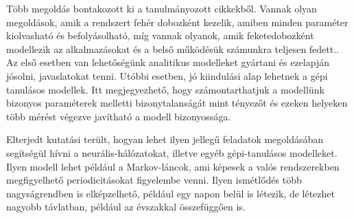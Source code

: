 Több megoldás bontakozott ki a tanulmányozott cikkekből. Vannak olyan megoldások, amik a rendszert fehér dobozként kezelik, amiben minden paraméter kiolvasható és befolyásolható, míg vannak olyanok, amik feketedobozként modellezik az alkalmazásokat és a belső működésük számunkra teljesen fedett.\citep{TowardsAnAdaptive}. Az első esetben van lehetőségünk analitikus modelleket gyártani és ezelapján jósolni, javaslatokat tenni. Utóbbi esetben, jó kiindulási alap lehetnek a gépi tanulásos modellek. Itt megjegyezhető, hogy számontarthatjuk a modellünk bizonyos paraméterek melletti bizonytalanságát mint tényezőt és ezeken helyeken több mérést végezve javítható a modell bizonyossága\citep{TowardsAnAdaptive}.

Elterjedt kutatási terült, hogyan lehet ilyen jellegű feladatok megoldásában segítségül hívni a neurális-hálózatokat, illetve egyéb gépi-tanulásos modelleket. Ilyen modell lehet például a Markov-láncok, ami képesek a valós rendszerekben megfigyelhető periodicitásokat figyelembe venni\citep{CloudScale}. Ilyen ismétlődés több nagyságrendben is elképzelhető, például egy napon belül is létezik, de létezhet nagyobb távlatban, például az évszakkal összefüggően is\citep{PredictingUsageAndProactiveScaling}.




